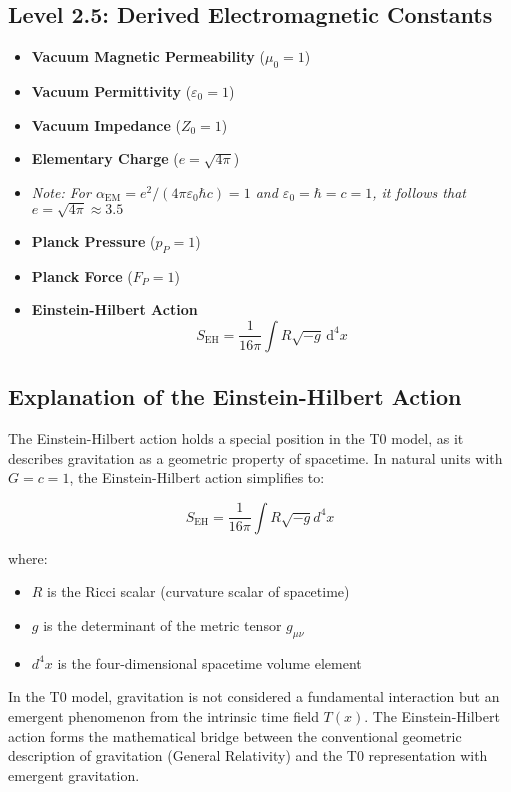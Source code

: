 \documentclass[12pt,a4paper]{article}
\newcommand{\alphaEM}{\alpha_{\text{EM}}}
\begin{document}
	\subsection*{Level 2.5: Derived Electromagnetic Constants}
	\begin{itemize}[itemsep=0.5em]
		\item \textbf{Vacuum Magnetic Permeability} (\(\mu_0 = 1\))
		\item \textbf{Vacuum Permittivity} (\(\varepsilon_0 = 1\))
		\item \textbf{Vacuum Impedance} (\(Z_0 = 1\))
		\item \textbf{Elementary Charge} (\(e = \sqrt{4\pi}\))
		\item[] \textit{Note: For $\alphaEM = e^2/(4\pi\varepsilon_0\hbar c) = 1$ and $\varepsilon_0 = \hbar = c = 1$, it follows that $e = \sqrt{4\pi} \approx 3.5$}
		\item \textbf{Planck Pressure} (\(p_P = 1\))
		\item \textbf{Planck Force} (\(F_P = 1\))
		\item \textbf{Einstein-Hilbert Action}
		\[
		S_{\mathrm{EH}} = \frac{1}{16\pi} \int R \sqrt{-g} \, \mathrm{d}^4x
		\]
	\end{itemize}
	
	\subsection*{Explanation of the Einstein-Hilbert Action}
	
	The Einstein-Hilbert action holds a special position in the T0 model, as it describes gravitation as a geometric property of spacetime. In natural units with $G = c = 1$, the Einstein-Hilbert action simplifies to:
	
	\[
	S_{\mathrm{EH}} = \frac{1}{16\pi}\int R\sqrt{-g}d^4x
	\]
	
	where:
	\begin{itemize}
		\item $R$ is the Ricci scalar (curvature scalar of spacetime)
		\item $g$ is the determinant of the metric tensor $g_{\mu\nu}$
		\item $d^4x$ is the four-dimensional spacetime volume element
	\end{itemize}
	
	In the T0 model, gravitation is not considered a fundamental interaction but an emergent phenomenon from the intrinsic time field $T(x)$. The Einstein-Hilbert action forms the mathematical bridge between the conventional geometric description of gravitation (General Relativity) and the T0 representation with emergent gravitation.
	
\end{document}
